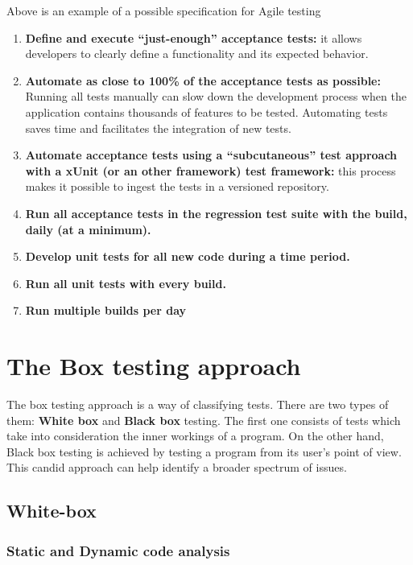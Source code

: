    Above is an example of a possible specification for Agile testing \cite{media_art_nodate}
    \begin{enumerate} 
        \item \textbf{Define and execute “just-enough”
        acceptance tests:} it allows developers to clearly define a functionality and its expected behavior.
    \item \textbf{Automate as close to 100\% of the
acceptance tests as possible:} Running all tests manually can slow down the development process when the application contains thousands of features to be tested. Automating tests saves time and facilitates the integration of new tests.
    \item \textbf{ Automate acceptance tests using a
“subcutaneous” test approach with a xUnit (or an other framework) test framework: } this process makes it possible to ingest the tests in a versioned repository.
    \item \textbf{Run all acceptance tests in the
regression test suite with the build, daily (at
a minimum).} 
    \item \textbf{Develop unit tests for all new code during a
time period.}
    \item \textbf{Run all unit tests with every build.}
    \item \textbf{Run multiple builds per day}
    \end{enumerate}

\newpage

\section{The Box testing approach}
The box testing approach is a way of classifying tests. There are two types of them: \textbf{White box} and \textbf{Black box} testing.
The first one consists of tests which take into consideration the inner workings of a program.
On the other hand, Black box testing is achieved by testing a program from its user's point of view. This candid approach can help identify a broader spectrum of issues.
\subsection{White-box}

\subsubsection{Static and Dynamic code analysis}


